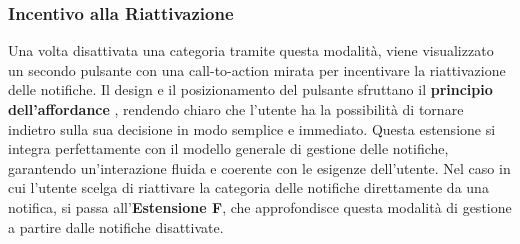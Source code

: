 \subsubsection{Incentivo alla Riattivazione}
Una volta disattivata una categoria tramite questa modalità, viene visualizzato un secondo pulsante con una call-to-action mirata per incentivare la riattivazione delle notifiche. Il design e il posizionamento del pulsante sfruttano il \textbf{principio dell’affordance} \cite{norman1988}, rendendo chiaro che l’utente ha la possibilità di tornare indietro sulla sua decisione in modo semplice e immediato.
\newline
Questa estensione si integra perfettamente con il modello generale di gestione delle notifiche, garantendo un’interazione fluida e coerente con le esigenze dell’utente. Nel caso in cui l’utente scelga di riattivare la categoria delle notifiche direttamente da una notifica, si passa all’\textbf{Estensione F}, che approfondisce questa modalità di gestione a partire dalle notifiche disattivate.
